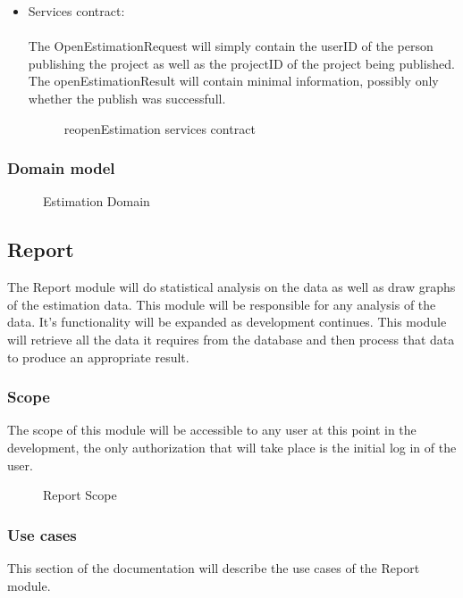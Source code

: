 	\begin{itemize}
		\item Services contract:\\ \\
		The OpenEstimationRequest will simply contain the userID of the person publishing the project as well as the projectID of the project being published. The openEstimationResult will contain minimal information, possibly only whether the publish was successfull.
		\begin{figure}[H]
	    	\centering
	    	\caption{reopenEstimation services contract}
	    	\label{fig:publishProject}
	   	\end{figure}
	\end{itemize}

\subsubsection{Domain model}
	\begin{figure}[H]
	    	\centering
	    	\caption{Estimation Domain}
	    	\label{fig:Estimation_Domain.png}
   	\end{figure}
\subsection{Report}
The Report module will do statistical analysis on the data as well as draw graphs of the estimation data. This module will be responsible for any analysis of the data. It's functionality will be expanded as development continues. This module will retrieve all the data it requires from the database and then process that data to produce an appropriate result.
\subsubsection{Scope}
The scope of this module will be accessible to any user at this point in the development, the only authorization that will take place is the initial log in of the user.
	\begin{figure}[H]
	    	\centering
	    	\caption{Report Scope}
	    	\label{fig:Report_Scope.png}
   	\end{figure}
\subsubsection{Use cases}
	This section of the documentation will describe the use cases of the Report module.
